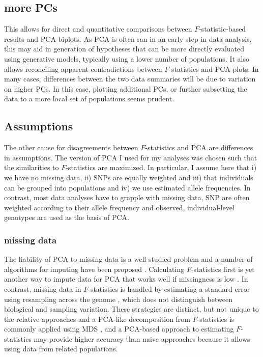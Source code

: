 \documentclass[12pt,fullpage, a4paper]{article}
\begin{document}
\subsection{more PCs}
This allows for direct and quantitative comparisons between $F$-statistic-based results and PCA biplots. As PCA is often ran in an early step in data analysis, this may aid in generation of hypotheses that can be more directly evaluated using generative models, typically using a lower number of populations. It also allows reconciling apparent contradictions between $F$-statistics and PCA-plots. In many cases, differences between the two data summaries will be due to variation on higher PCs. In this case, plotting additional PCs, or further subsetting the data to a more local set of populations seems prudent. 


\subsection{Assumptions}
The other cause for disagreements between $F$-statistics and PCA are differences in assumptions. The version of PCA I used for my analyses was chosen such that the similarities to $F$-statistics are maximized. In particular, I assume here that i) we have no missing data, ii) SNPs are equally weighted and iii) that individuals can be grouped into populations and iv) we use estimated allele frequencies. In contrast, most data analyses have to grapple with missing data, SNP are often weighted according to their allele frequency and observed, individual-level genotypes are used as the basis of PCA.

\subsubsection{missing data}
The liability of PCA to missing data is a well-studied problem and a number of algorithms for imputing have been proposed \citep[e.g.][]{hastie2015, meisner2018, meisner2021}. Calculating $F$-statistics first is yet another way to impute data for PCA that works well if missingness is low \citep{meisner2021}. In contrast, missing data in $F$-statistics is handled by estimating a standard error using resampling across the genome \citep{patterson2012}, which does not distinguish between biological and sampling variation. These strategies are distinct, but not unique to the relative approaches and a PCA-like decomposition from $F$-statistics is commonly applied using MDS \citep[e.g.][]{fu2016}, and a PCA-based approach to estimating $F$-statistics may provide higher accuracy than naive approaches because it allows using data from related populations.
\end{document}
